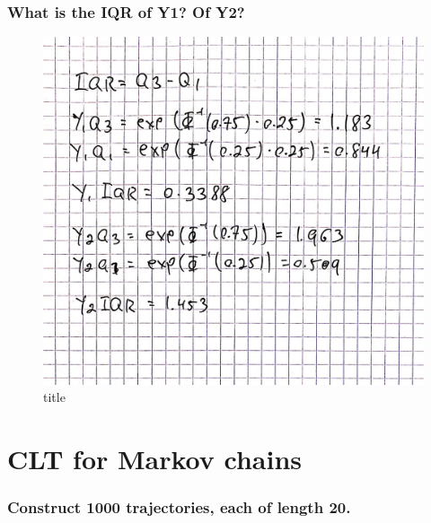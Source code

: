 \documentclass[11pt]{article}
\makeatletter
\def\maxwidth{\ifdim\Gin@nat@width>\linewidth\linewidth
    \else\Gin@nat@width\fi}
\let\Oldincludegraphics\includegraphics
\renewcommand{\includegraphics}[1]{\Oldincludegraphics[width=.8\maxwidth]{#1}}
\makeatother
\begin{document}
    \hypertarget{what-is-the-iqr-of-y1-of-y2}{%
\subsubsection{What is the IQR of Y1? Of
Y2?}\label{what-is-the-iqr-of-y1-of-y2}}

    \begin{figure}
\centering
\includegraphics{4-5.JPG}
\caption{title}
\end{figure}

    \hypertarget{clt-for-markov-chains}{%
\section{CLT for Markov chains}\label{clt-for-markov-chains}}

    \hypertarget{construct-1000-trajectories-each-of-length-20.}{%
\subsubsection{Construct 1000 trajectories, each of length
20.}\label{construct-1000-trajectories-each-of-length-20.}}
\end{document}
